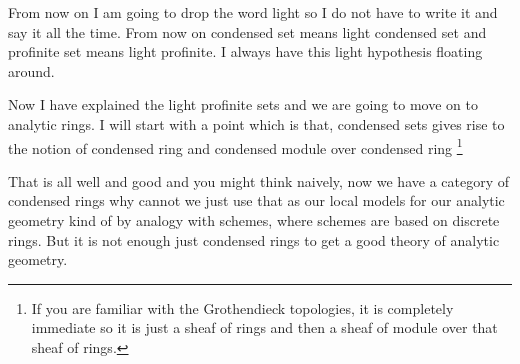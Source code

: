 \begin{convention}[Dustin]
    From now on I am going to drop the word light so I do not have to write it and say it all the time. From now on condensed set means 
    light condensed set and profinite set means light profinite. I always have this light hypothesis floating around.
\end{convention}


Now I have explained the light profinite sets and we are going to move on to analytic rings.
I will start with a point which is that, condensed sets gives rise to the notion of condensed ring and condensed module over 
condensed ring \footnote{If you are familiar with the Grothendieck topologies, it is completely immediate so it is just a sheaf of rings and then a 
    sheaf of module over that sheaf of rings.}  




That is all well and good and you might think naively, now we have a category of condensed rings why 
cannot we just use that as our local models for our analytic geometry kind of by analogy with schemes, where schemes are based on 
discrete rings. But it is not enough just condensed rings to get a good theory of analytic geometry.





